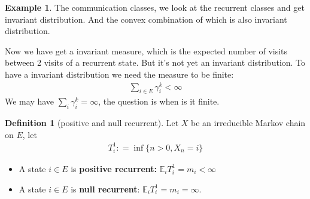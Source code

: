 \documentclass[a4paper,11pt]{book}
\theoremstyle{definition}
\newtheorem{definition}{Definition}[section]
\newtheorem*{example}{Example}
\theoremstyle{remark}
\begin{document}
\begin{example}
The communication classes, we look at the recurrent classes and get invariant distribution. And the convex combination of which is also invariant distribution.	
\end{example}



Now we have get a invariant measure, which is the expected number of visits between 2 visits of a recurrent state. But it's not yet an invariant distribution. To have a invariant distribution we need the measure to be finite:
\begin{align*}
	\sum_{i \in E} \gamma_i^k < \infty
\end{align*}	
We may have $\sum_{i} \gamma_i^k = \infty$, the question is when is it finite.

\begin{definition}[positive and null recurrent]
	Let $X$ be an irreducible Markov chain on $E$, let 
	\begin{align*}
		T_i^1 : = \inf\{ n > 0, X_n = i\}
	\end{align*}
	\begin{itemize}
		\item A state $i \in E$ is \textbf{positive recurrent:} $\mathbb{E}_i T_i^1 = m_i < \infty$
		\item A state $i \in E$ is \textbf{null recurrent}: $\mathbb{E}_i T_i^1 = m_i =\infty$.
	\end{itemize}
\end{definition}
\end{document}
